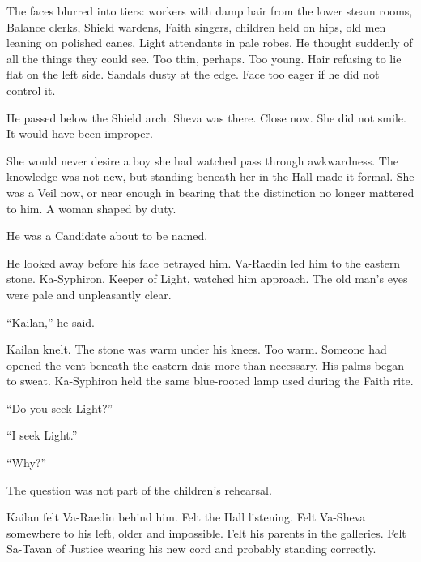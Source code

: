 The faces blurred into tiers: workers with damp hair from the lower steam rooms, Balance clerks, Shield wardens, Faith singers, children held on hips, old men leaning on polished canes, Light attendants in pale robes. He thought suddenly of all the things they could see. Too thin, perhaps. Too young. Hair refusing to lie flat on the left side. Sandals dusty at the edge. Face too eager if he did not control it.\par

He passed below the Shield arch. Sheva was there. Close now. She did not smile. It would have been improper.\par

She would never desire a boy she had watched pass through awkwardness. The knowledge was not new, but standing beneath her in the Hall made it formal. She was a Veil now, or near enough in bearing that the distinction no longer mattered to him. A woman shaped by duty.\par

He was a Candidate about to be named.\par

He looked away before his face betrayed him. Va-Raedin led him to the eastern stone. Ka-Syphiron, Keeper of Light, watched him approach. The old man’s eyes were pale and unpleasantly clear.\par

“Kailan,” he said.\par

Kailan knelt. The stone was warm under his knees. Too warm. Someone had opened the vent beneath the eastern dais more than necessary. His palms began to sweat. Ka-Syphiron held the same blue-rooted lamp used during the Faith rite.\par

“Do you seek Light?”\par

“I seek Light.”\par

“Why?”\par

The question was not part of the children’s rehearsal.\par

Kailan felt Va-Raedin behind him. Felt the Hall listening. Felt Va-Sheva somewhere to his left, older and impossible. Felt his parents in the galleries. Felt Sa-Tavan of Justice wearing his new cord and probably standing correctly.\par

